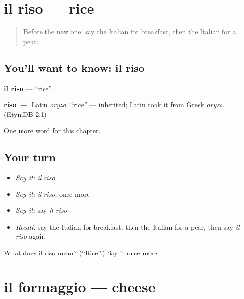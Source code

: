 \section[il riso]{il riso — rice}

\label{lesson:IT-C55-riso}



\begin{quote}
Before the new one: say the Italian for breakfast, then the Italian for a pear.
\end{quote}

\subsection*{You'll want to know: il riso}
\textbf{il riso} — \textquotedblleft{}rice\textquotedblright{}.

\begin{cousinweb}
\textbf{riso} $\leftarrow$ Latin \emph{oryza}, \textquotedblleft{}rice\textquotedblright{} — inherited; Latin took it from Greek \emph{oryza}. (EtymDB 2.1)
\end{cousinweb}

\begin{grammarlens}[title={What you've built}]
One more word for this chapter.
\end{grammarlens}

\subsection*{Your turn}
\begin{itemize}
\raggedright
  \item \emph{Say it:} \emph{il riso}
  \item \emph{Say it:} \emph{il riso}, once more
  \item \emph{Say it:} say \emph{il riso}
  \item \emph{Recall:} say the Italian for breakfast, then the Italian for a pear, then say \emph{il riso} again
\end{itemize}

\begin{tcolorbox}[breakable,colback=teal!4,colframe=teal!35!black,title={Before you move on}]
What does il riso mean? (\textquotedblleft{}Rice\textquotedblright{}.) Say it once more.
\end{tcolorbox}
\section[il formaggio]{il formaggio — cheese}

